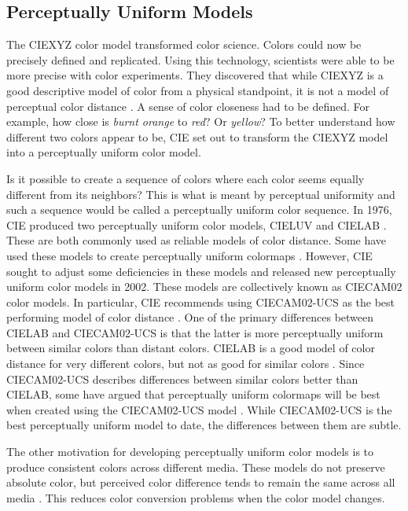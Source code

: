 \documentclass[journal,12pt]{IEEEtran}
\begin{document}
\subsection{Perceptually Uniform Models}

The CIEXYZ color model transformed color science. Colors could now be precisely defined and replicated.
Using this technology, scientists were able to be more precise with color experiments.
They discovered that while CIEXYZ is a good descriptive model of color from a physical standpoint, it
is not a model of perceptual color distance \cite{viridis}.
A sense of color closeness had to be defined. For example, how close is \textit{burnt orange} to \textit{red}?
Or \textit{yellow}? To better understand how different two colors appear to be, CIE set out to
transform the CIEXYZ model into a perceptually uniform color model.

Is it possible to create a sequence of colors where each color seems equally different from its neighbors?
This is what is meant by perceptual uniformity and such a sequence would be called
a perceptually uniform color sequence.
In 1976, CIE produced two perceptually uniform color models, CIELUV and CIELAB \cite{colorimetry}.
These are both commonly used as reliable models of color distance. Some have used these models
to create perceptually uniform colormaps \cite{viridis,matlab}.
However, CIE sought to adjust some deficiencies in these models and
released new perceptually uniform color models in 2002. These models are collectively known as 
CIECAM02 color models. In particular, CIE recommends using CIECAM02-UCS as the best
performing model of color distance \cite{ciecam02}.
One of the primary differences between CIELAB and CIECAM02-UCS is that the latter
is more perceptually uniform between similar colors than distant colors. CIELAB
is a good model of color distance for very different colors, but not as good for similar colors \cite{viridis,ciecam02}.
Since CIECAM02-UCS describes differences between similar colors better than CIELAB, some have argued that
perceptually uniform colormaps will be best when created using the CIECAM02-UCS model \cite{viridis}.
While CIECAM02-UCS is the best perceptually uniform model to date, the differences between them are subtle.

The other motivation for developing perceptually
uniform color models is to produce consistent colors across different media.
These models do not preserve absolute color, but perceived color difference tends
to remain the same across all media \cite{ciecam02}.
This reduces color conversion problems when the color model changes.
\end{document}
